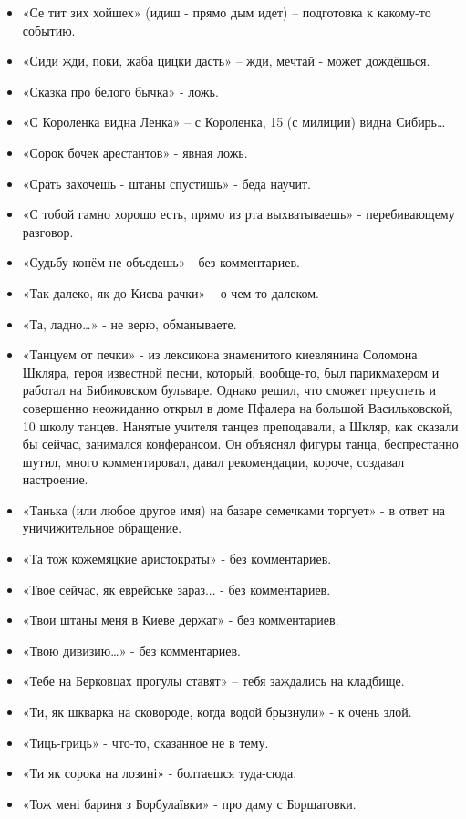 \begin{itemize}
\item  «Се тит зих хойшех» (идиш - прямо дым идет) – подготовка к какому-то 
событию.
\item  «Сиди жди, поки, жаба цицки дасть» – жди, мечтай - может дождёшься.
\item  «Сказка про белого бычка»  - ложь.
\item  «С Короленка видна Ленка» – с Короленка, 15 (с милиции) видна Сибирь…
\item  «Сорок бочек арестантов» - явная ложь.
\item  «Срать захочешь - штаны спустишь» - беда научит.
\item  «С тобой гамно хорошо есть, прямо из рта выхватываешь» - перебивающему разговор.
\item  «Судьбу конём не объедешь» - без комментариев.
\item  «Так далеко, як до Києва рачки» – о чем-то далеком.
\item  «Та, ладно…» - не верю, обманываете.
\item  «Танцуем от печки» - из лексикона знаменитого киевлянина Соломона Шкляра, героя известной песни, который, вообще-то, был парикмахером и работал на Бибиковском бульваре. Однако решил, что сможет преуспеть и совершенно неожиданно открыл в доме Пфалера на большой Васильковской, 10 школу танцев. Нанятые учителя танцев преподавали, а Шкляр, как сказали бы сейчас, занимался конферансом. Он объяснял фигуры танца, беспрестанно шутил, много комментировал, давал рекомендации, короче, создавал настроение. 
\item  «Танька (или любое другое имя) на базаре семечками торгует» - в ответ на уничижительное обращение.
\item  «Та тож кожемяцкие аристократы» - без комментариев.
\item  «Твое сейчас, як еврейське зараз... - без комментариев.
\item  «Твои штаны меня в Киеве держат» - без комментариев.
\item  «Твою дивизию…» - без комментариев.
\item  «Тебе на Берковцах прогулы ставят» – тебя заждались на кладбище.
\item  «Ти, як шкварка на сковороде, когда водой брызнули» - к очень злой.
\item  «Тиць-гриць» - что-то, сказанное не в тему.
\item  «Ти як сорока на лозині» - болтаешся туда-сюда.
\item  «Тож мені бариня з Борбулаївки» - про даму с Борщаговки.

\end{itemize}
